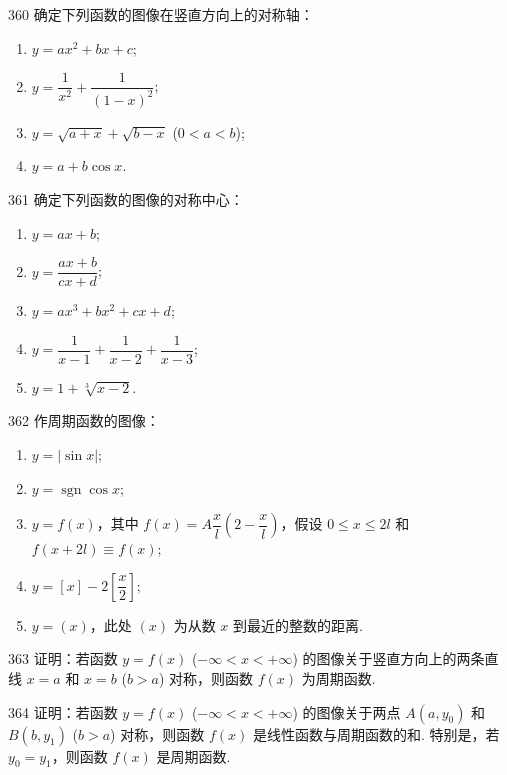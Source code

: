 \begin{prob}[L]{360}
确定下列函数的图像在竖直方向上的对称轴：
\begin{enumerate}[label=(\alph*), itemsep=2pt, topsep=3pt]
  \item $y = ax^2 + bx + c$;
  \item $y = \dfrac{1}{x^2} + \dfrac{1}{(1 - x)^2}$;
  \item $y = \sqrt{a + x} + \sqrt{b - x}$ ($0 < a < b$);
  \item $y = a + b\cos x$.
\end{enumerate}
\end{prob}

\begin{prob}[L]{361}
确定下列函数的图像的对称中心：
\begin{enumerate}[label=(\alph*), itemsep=2pt, topsep=3pt]
  \item $y = ax + b$;
  \item $y = \dfrac{ax + b}{cx + d}$;
  \item $y = ax^3 + bx^2 + cx + d$;
  \item $y = \dfrac{1}{x - 1} + \dfrac{1}{x - 2} + \dfrac{1}{x - 3}$;
  \item $y = 1 + \sqrt[3]{x - 2}$.
\end{enumerate}
\end{prob}

\begin{prob}[L]{362}
作周期函数的图像：
\begin{enumerate}[label=(\alph*), itemsep=2pt, topsep=3pt]
  \item $y = |\sin x|$;
  \item $y = \operatorname{sgn}\cos x$;
  \item $y = f(x)$，其中 $f(x) = A\dfrac{x}{l}\left(2 - \dfrac{x}{l}\right)$，假设 $0 \leqslant x \leqslant 2l$ 和 $f(x + 2l) \equiv f(x)$;
  \item $y = [x] - 2\left[\dfrac{x}{2}\right]$;
  \item $y = (x)$，此处 $(x)$ 为从数 $x$ 到最近的整数的距离.
\end{enumerate}
\end{prob}

\begin{prob}[M]{363}
证明：若函数 $y = f(x)$ ($-\infty < x < +\infty$) 的图像关于竖直方向上的两条直线 $x = a$ 和 $x = b$ ($b > a$) 对称，则函数 $f(x)$ 为周期函数.
\end{prob}

\begin{prob}[M]{364}
证明：若函数 $y = f(x)$ ($-\infty < x < +\infty$) 的图像关于两点 $A(a, y_0)$ 和 $B(b, y_1)$ ($b > a$) 对称，则函数 $f(x)$ 是线性函数与周期函数的和. 特别是，若 $y_0 = y_1$，则函数 $f(x)$ 是周期函数.
\end{prob}

